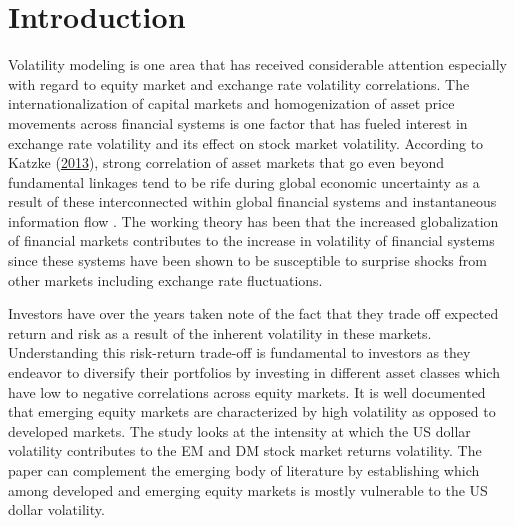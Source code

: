\documentclass[11pt,preprint, authoryear]{elsarticle}
\numberwithin{equation}{section}
\numberwithin{figure}{section}
\numberwithin{table}{section}
\begin{document}
\pagestyle{fancy}
\chead{}
\rhead{}
\lfoot{}
\lhead{}
\cfoot{}


\headsep 35pt %




\hypertarget{introduction}{%
\section{\texorpdfstring{Introduction
\label{Introduction}}{Introduction }}\label{introduction}}

Volatility modeling is one area that has received considerable attention
especially with regard to equity market and exchange rate volatility
correlations. The internationalization of capital markets and
homogenization of asset price movements across financial systems is one
factor that has fueled interest in exchange rate volatility and its
effect on stock market volatility. According to Katzke
(\protect\hyperlink{ref-katzke2013}{2013}), strong correlation of asset
markets that go even beyond fundamental linkages tend to be rife during
global economic uncertainty as a result of these interconnected within
global financial systems and instantaneous information flow . The
working theory has been that the increased globalization of financial
markets contributes to the increase in volatility of financial systems
since these systems have been shown to be susceptible to surprise shocks
from other markets including exchange rate fluctuations.

Investors have over the years taken note of the fact that they trade off
expected return and risk as a result of the inherent volatility in these
markets. Understanding this risk-return trade-off is fundamental to
investors as they endeavor to diversify their portfolios by investing in
different asset classes which have low to negative correlations across
equity markets. It is well documented that emerging equity markets are
characterized by high volatility as opposed to developed markets. The
study looks at the intensity at which the US dollar volatility
contributes to the EM and DM stock market returns volatility. The paper
can complement the emerging body of literature by establishing which
among developed and emerging equity markets is mostly vulnerable to the
US dollar volatility.
\end{document}
